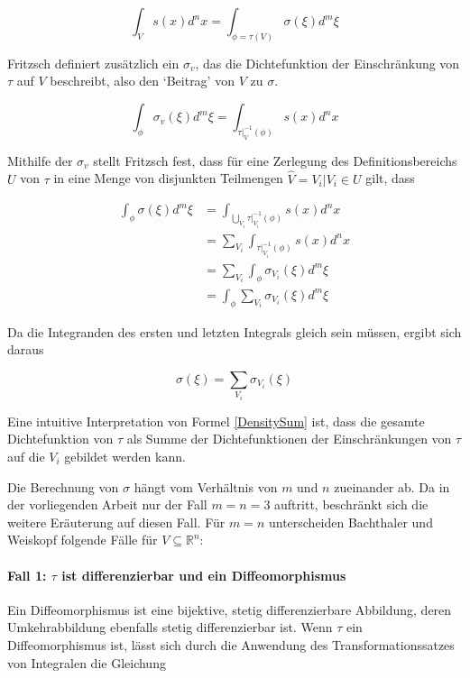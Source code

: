 \documentclass[a4paper,fontsize=12pt,toc=bib,halfparskip]{scrartcl}
\begin{document}
\begin{equation}
\int_{V}s(x)d^nx = \int_{\phi = \tau(V)}\sigma(\xi)d^m\xi
\end{equation}

Fritzsch \cite[S.~20~f.]{fritzsch2016continuousScatterplot} definiert zus\"atzlich ein $\sigma_v$, das die Dichtefunktion der Einschr\"ankung von $\tau$ auf $V$ beschreibt, also den `Beitrag' von $V$ zu $\sigma$.

\begin{equation}
\int_{\phi} \sigma_v(\xi)d^m\xi = \int_{\tau|_V^{-1}(\phi)}s(x)d^nx
\end{equation}

Mithilfe der $\sigma_v$ stellt Fritzsch fest, dass f\"ur eine Zerlegung des Definitionsbereichs $U$ von $\tau$ in eine Menge von disjunkten Teilmengen $\hat{V} = {V_i | V_i \in U}$ gilt, dass

\begin{equation}
\begin{split}
\int_{\phi}\sigma(\xi)d^m\xi 
&= \int_{\bigcup\limits_{V_i}\tau|_{V_i}^{-1}(\phi)} s(x)d^nx
\\
&= \sum_{V_i}\int_{\tau|_{V_i}^{-1}(\phi)} s(x)d^nx
\\
&= \sum_{V_i}\int_{\phi}\sigma_{V_i}(\xi)d^m\xi
\\
&= \int_{\phi}\sum_{V_i}\sigma_{V_i}(\xi)d^m\xi
\end{split}
\end{equation}

Da die Integranden des ersten und letzten Integrals gleich sein m\"ussen, ergibt sich daraus

\begin{equation}
\sigma(\xi) = \sum_{V_i}\sigma_{V_i}(\xi)
\label{DensitySum}
\end{equation}

Eine intuitive Interpretation von Formel \ref{DensitySum} ist, dass die gesamte Dichtefunktion von $\tau$ als Summe der Dichtefunktionen der Einschr\"ankungen von $\tau$ auf die $V_i$ gebildet werden kann.

Die Berechnung von $\sigma$ h\"angt vom Verh\"altnis von $m$ und $n$ zueinander ab. Da in der vorliegenden Arbeit nur der Fall $m=n=3$ auftritt, beschr\"ankt sich die weitere Er\"auterung auf diesen Fall. F\"ur $m=n$ unterscheiden Bachthaler und Weiskopf folgende F\"alle f\"ur $V \subseteq \mathbb{R}^n$\cite[S.~1430]{bachthaler2008continuous}:

\paragraph{Fall 1: $\tau$ ist differenzierbar und ein Diffeomorphismus}
Ein Diffeomorphismus ist eine bijektive, stetig differenzierbare Abbildung, deren Umkehrabbildung ebenfalls stetig differenzierbar ist. 
Wenn $\tau$ ein Diffeomorphismus ist, l\"asst sich durch die Anwendung des Transformationssatzes von Integralen die Gleichung 
\end{document}
